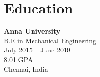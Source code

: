 \documentclass[10pt, letterpaper]{article}
\begin{document}
    \section{Education}
        \textbf{Anna University} \\
        B.E in Mechanical Engineering \\
        July 2015 – June 2019 \\
        8.01 GPA \\
        Chennai, India
\end{document}
